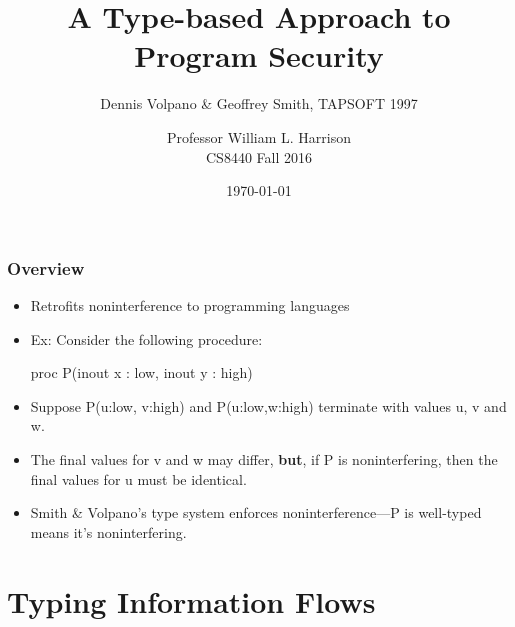 \documentclass{beamer}
\title{A Type-based Approach to Program Security}
\subtitle{Dennis Volpano \& Geoffrey Smith, TAPSOFT 1997}
\author{Professor William L. Harrison\\CS8440 Fall 2016}
\date{\today}
\begin{document}
\frame{\titlepage}

\begin{frame}[fragile]
\frametitle{Overview}


\begin{itemize}
\item Retrofits noninterference to programming languages
\pause
\item Ex: Consider the following procedure: 
\begin{haskell}
proc P(inout x : low, inout y : high)
\end{haskell}
\pause
\item Suppose \<P(u:low, v:high)\> and \<P(u:low,w:high)\> terminate
      with values \<u\>, \<v\> and \<w\>.
\pause
\item The final values for \<v\> and \<w\> may differ, 
 {\bf but}, if \<P\> is noninterfering, then the final values for \<u\> must be identical.
\pause
\item Smith \& Volpano's type system enforces noninterference---\<P\> is well-typed means it's noninterfering.
\end{itemize}

\end{frame}

\section{Typing Information Flows}
\end{document}

